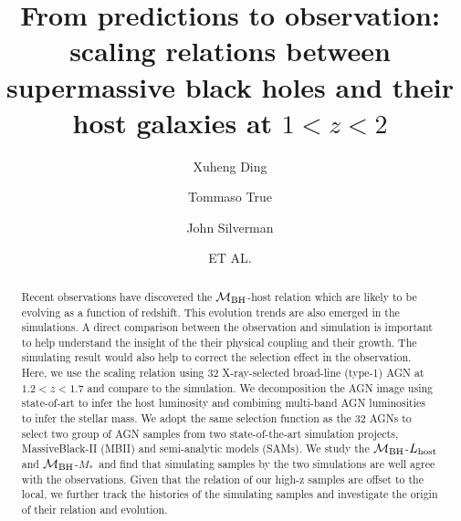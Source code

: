 \documentclass[twocolumn]{aastex62}
\begin{document}
\def\lcdm{$\Lambda$CDM}
\def\hst{{\it HST}}
\def\efr{$R_{\mathrm{eff}}$}
\def\galfit{{\sc Galfit}}
\def\mbh{$\mathcal M_{\rm BH}$}
\def\lhost{$L_{\rm host}$}
\def\jcap{Journal of Cosmology and Astroparticle Physics}
\def\halpha{${\it H}\alpha$}
\def\hbeta{${\it H}\beta$}
\def\sersic{S\'ersic}
\def\lenstronomy{{\sc Lenstronomy}}
\def\Reff{{$R_{\mathrm{eff}}$}}
\def\kms{km~s$^{\rm -1}$}
\def\sigstar{{$\sigma_*$}}
\def\smass{{$M_*$}}
\newcommand{\Mgii}{Mg$_{\rm II}$}
\newcommand{\Civ}{C$_{\rm IV}$}

\title{From predictions to observation: scaling relations between supermassive black holes and their host galaxies at $1< z<2$}


\author%
{Xuheng Ding}

\author%
{Tommaso True}

\author%
{John Silverman}

\author{ET AL.}


\begin{abstract}
Recent observations have discovered the \mbh-host relation which are likely to be evolving as a function of redshift. This evolution trends are also emerged in the simulations. A direct comparison between the observation and simulation is important to help understand the insight of the their physical coupling and their growth. The simulating result would also help to correct the selection effect in the observation.
Here, we use the scaling relation using 32 X-ray-selected broad-line (type-1) AGN at $1.2 < z < 1.7$ and compare to the simulation. We decomposition the AGN image using state-of-art to infer the host luminosity and combining multi-band AGN luminosities to infer the stellar mass. We adopt the same selection function as the 32 AGNs to select two group of AGN samples from two state-of-the-art simulation projects, MassiveBlack-II (MBII) and semi-analytic models (SAMs). %
We study the \mbh-\lhost and \mbh-\smass\ and find that simulating samples by the two simulations are well agree with the observations. Given that the relation of our high-z samples are offset to the local, we further track the histories of the simulating samples and investigate the origin of their relation and evolution. 
  
\end{abstract}
\end{document}
